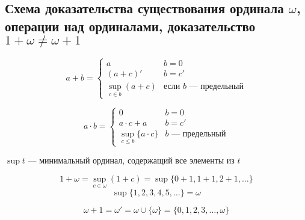 \documentclass[english]{article}
\begin{document}
\subsection{Схема доказательства существования ординала \(\omega\), операции над ординалами, доказательство \(1+\omega\ne\omega+1\)}
\label{sec:org7b2754b}
\begin{definition}
	\[ a + b = \begin{cases}
			a                            & b = 0                               \\
			(a + c)'                     & b = c'                              \\
			\sup\limits_{c \in b}(a + c) & \text{если }b\text{ --- предельный}
		\end{cases} \]
	\label{org860455f}
\end{definition}
\begin{definition}
	\[ a \cdot b = \begin{cases}
			0                           & b = 0                   \\
			a\cdot c + a                & b = c'                  \\
			\sup_{c \le b}\{a \cdot c\} & b\text{ --- предельный}
		\end{cases} \]
	\label{org1dd2330}
\end{definition}
\begin{definition}
	\(\sup t\) --- минимальный ординал, содержащий все элементы из \(t\)
	\label{org02534bb}
\end{definition}
\begin{examp}
	\[1 + \omega = \sup\limits_{c \in \omega}(1 + c) = \sup \{0 + 1, 1 + 1, 2+ 1, \dots\}\]
	\[ \sup \{1, 2, 3, 4, 5, \dots\} = \omega \]
	\label{orgb2b1bbf}
\end{examp}
\begin{examp}
	\[ \omega + 1 = \omega' = \omega \cup \{\omega\} = \{0, 1, 2, 3, \dots, \omega\} \]
	\label{org3128bee}
\end{examp}
\end{document}
